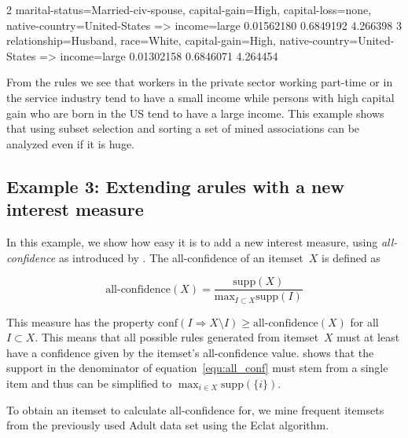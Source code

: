 \documentclass[10pt,a4paper]{article}
\begin{document}
{\begin{Schunk}
\begin{Soutput}
2 {marital-status=Married-civ-spouse,                                                 
   capital-gain=High,                                                                 
   capital-loss=none,                                                                 
   native-country=United-States}      => {income=large} 0.01562180  0.6849192 4.266398
3 {relationship=Husband,                                                              
   race=White,                                                                        
   capital-gain=High,                                                                 
   native-country=United-States}      => {income=large} 0.01302158  0.6846071 4.264454
\end{Soutput}
\end{Schunk}
}

From the rules we see that workers in the private sector working part-time or
in the service industry tend to have a small income
while persons with high capital gain who are born in the US tend to have a
large income.
This example shows that using subset selection and sorting a
set of mined associations can be
analyzed even if it is huge.

\subsection{Example 3: Extending arules with a new interest measure\label{sec:example-allconf}}

In this example, we show how easy it is to add a new interest measure,
using \emph{all-confidence} as introduced by
\cite{arules:Omiecinski:2003}.  The all-confidence of an itemset~$X$ is
defined as

\begin{equation}
\mbox{all-confidence}(X) = \frac{\mathrm{supp}(X)}
{\mathrm{max}_{I \subset X} \mathrm{supp}(I)}
\label{equ:all_conf}
\end{equation}

This measure has the property $\mathrm{conf}(I \Rightarrow X \setminus
I) \ge \mbox{all-confidence}(X)$ for all $I \subset X$.  This means that
all possible rules generated from itemset~$X$ must at least have a
confidence given by the itemset's all-confidence value.
\cite{arules:Omiecinski:2003} shows that the support in the denominator
of equation~\ref{equ:all_conf} must stem from a single item and thus can
be simplified to $\max_{i \in X} \mathrm{supp}(\{i\})$.

To obtain an itemset to calculate all-confidence for, we mine frequent
itemsets from the previously used Adult data set using the Eclat
algorithm.
\end{document}
